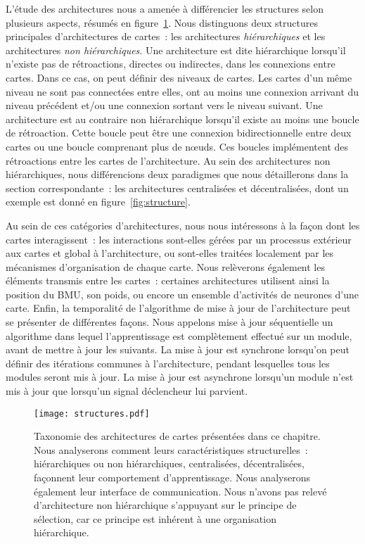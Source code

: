 \documentclass[../main]{subfiles}
\begin{document}
L'étude des architectures nous a amenée à différencier les structures selon plusieurs aspects, résumés en figure~\ref{fig:taxo}.
Nous distinguons deux structures principales d'architectures de cartes~: les architectures \emph{hiérarchiques} et les architectures \emph{non hiérarchiques}.
Une architecture est dite hiérarchique lorsqu'il n'existe pas de rétroactions, directes ou indirectes, dans les connexions entre cartes. Dans ce cas, on peut définir des niveaux de cartes. Les cartes d'un même niveau ne sont pas connectées entre elles, ont au moins une connexion arrivant du niveau précédent et/ou une connexion sortant vers le niveau suivant.
Une architecture est au contraire non hiérarchique lorsqu'il existe au moins une boucle de rétroaction. Cette boucle peut être une connexion bidirectionnelle entre deux cartes ou une boucle comprenant plus de n\oe{}uds. Ces boucles implémentent des rétroactions entre les cartes de l'architecture.
Au sein des architectures non hiérarchiques, nous différencions deux paradigmes que nous détaillerons dans la section correspondante~: les architectures centralisées et décentralisées, dont un exemple est donné en figure~\ref{fig:structure}.

Au sein de ces catégories d'architectures, nous nous intéressons à la façon dont les cartes interagissent~:
les interactions sont-elles gérées par un processus extérieur aux cartes et global à l'architecture, ou sont-elles traitées localement par les mécanismes d'organisation de chaque carte.
Nous relèverons également les éléments transmis entre les cartes~:
certaines architectures utilisent ainsi la position du BMU, son poids, ou encore un ensemble d'activités de neurones d'une carte.
Enfin, la temporalité de l'algorithme de mise à jour de l'architecture peut se présenter de différentes façons. Nous appelons mise à jour séquentielle un algorithme dans lequel l'apprentissage est complètement effectué sur un module, avant de mettre à jour les suivants. La mise à jour est synchrone lorsqu'on peut définir des itérations communes à l'architecture, pendant lesquelles tous les modules seront mis à jour. La mise à jour est asynchrone lorsqu'un module n'est mis à jour que lorsqu'un signal déclencheur lui parvient.

\begin{figure}
\centering\texttt{[image: structures.pdf]}
\caption{Taxonomie des architectures de cartes présentées dans ce chapitre. Nous analyserons comment leurs caractéristiques structurelles~: hiérarchiques ou non hiérarchiques, centralisées, décentralisées, façonnent leur comportement d'apprentissage. Nous analyserons également leur interface de communication. Nous n'avons pas relevé d'architecture non hiérarchique s'appuyant sur le principe de sélection, car ce principe est inhérent à une organisation hiérarchique. \label{fig:taxo}}
\end{figure}
\end{document}
